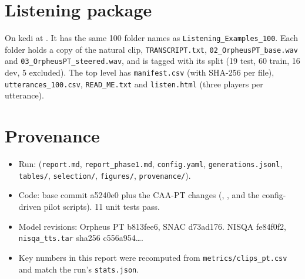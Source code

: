 \documentclass[11pt]{article}
\begin{document}
\section{Listening package}\label{sec:listening}
On kedi at . It has the same 100 folder names as \texttt{Listening\_Examples\_100}. Each folder holds a copy of the natural clip, \texttt{TRANSCRIPT.txt}, \texttt{02\_OrpheusPT\_base.wav} and \texttt{03\_OrpheusPT\_steered.wav}, and is tagged with its split (19 test, 60 train, 16 dev, 5 excluded). The top level has \texttt{manifest.csv} (with SHA-256 per file), \texttt{utterances\_100.csv}, \texttt{READ\_ME.txt} and \texttt{listen.html} (three players per utterance).

\appendix
\section{Provenance}
\begin{itemize}
\item Run:  (\texttt{report.md}, \texttt{report\_phase1.md}, \texttt{config.yaml}, \texttt{generations.jsonl}, \texttt{tables/}, \texttt{selection/}, \texttt{figures/}, \texttt{provenance/}).
\item Code: base commit a5240e0 plus the CAA-PT changes (, , and the config-driven pilot scripts). 11 unit tests pass.
\item Model revisions: Orpheus PT b813fee6, SNAC d73ad176. NISQA fe84f0f2, \texttt{nisqa\_tts.tar} sha256 c556a954\ldots.
\item Key numbers in this report were recomputed from \texttt{metrics/clips\_pt.csv} and match the run's \texttt{stats.json}.
\end{itemize}
\end{document}
